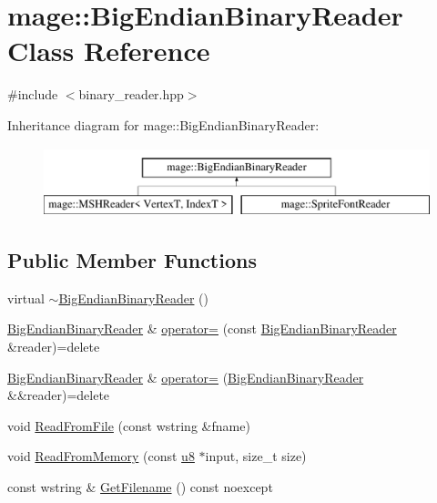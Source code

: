 \hypertarget{classmage_1_1_big_endian_binary_reader}{}\section{mage\+:\+:Big\+Endian\+Binary\+Reader Class Reference}
\label{classmage_1_1_big_endian_binary_reader}


{\ttfamily \#include $<$binary\+\_\+reader.\+hpp$>$}

Inheritance diagram for mage\+:\+:Big\+Endian\+Binary\+Reader\+:\begin{figure}[H]
\begin{center}
\leavevmode
\includegraphics[height=2.000000cm]{classmage_1_1_big_endian_binary_reader}
\end{center}
\end{figure}
\subsection*{Public Member Functions}
\begin{DoxyCompactItemize}
\item 
virtual \hyperlink{classmage_1_1_big_endian_binary_reader_ae85a40e8ed06e8c887e38d914843b8d3}{$\sim$\+Big\+Endian\+Binary\+Reader} ()
\item 
\hyperlink{classmage_1_1_big_endian_binary_reader}{Big\+Endian\+Binary\+Reader} \& \hyperlink{classmage_1_1_big_endian_binary_reader_abd4b24df4219469a8c2e9253b1cad405}{operator=} (const \hyperlink{classmage_1_1_big_endian_binary_reader}{Big\+Endian\+Binary\+Reader} \&reader)=delete
\item 
\hyperlink{classmage_1_1_big_endian_binary_reader}{Big\+Endian\+Binary\+Reader} \& \hyperlink{classmage_1_1_big_endian_binary_reader_a9e2e0dd62afff04774d0246f7e5e4ce4}{operator=} (\hyperlink{classmage_1_1_big_endian_binary_reader}{Big\+Endian\+Binary\+Reader} \&\&reader)=delete
\item 
void \hyperlink{classmage_1_1_big_endian_binary_reader_aec453e82d9b318e04894d4168db23715}{Read\+From\+File} (const wstring \&fname)
\item 
void \hyperlink{classmage_1_1_big_endian_binary_reader_aa34a9de3b9d98f0abe423e488f97d5b4}{Read\+From\+Memory} (const \hyperlink{namespacemage_a5a362e2d56fc439362a80516ecae7828}{u8} $\ast$input, size\+\_\+t size)
\item 
const wstring \& \hyperlink{classmage_1_1_big_endian_binary_reader_a801558f27606dbc681809178aaaaacd1}{Get\+Filename} () const noexcept
\end{DoxyCompactItemize}
